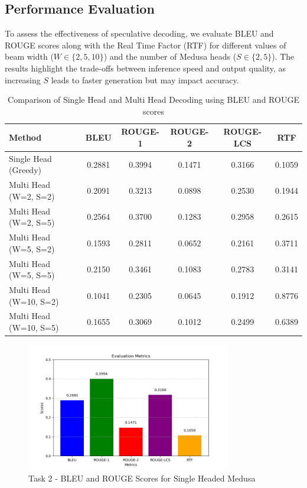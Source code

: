 \documentclass[12pt]{article}
\begin{document}
\subsection{Performance Evaluation}
To assess the effectiveness of speculative decoding, we evaluate BLEU and ROUGE scores along with the Real Time Factor (RTF) for different values of beam width ($W \in \{2, 5, 10\}$) and the number of Medusa heads ($S \in \{2, 5\}$). The results highlight the trade-offs between inference speed and output quality, as increasing $S$ leads to faster generation but may impact accuracy.

\begin{table}[htbp]
    \centering
    \begin{tabular}{|lccccc|}
        \hline
        \textbf{Method} & \textbf{BLEU} & \textbf{ROUGE-1} & \textbf{ROUGE-2} & \textbf{ROUGE-LCS} & \textbf{RTF} \\
        \hline
        Single Head (Greedy) & 0.2881 & 0.3994 & 0.1471 & 0.3166 & 0.1059 \\
        \hline
        Multi Head (W=2, S=2) & 0.2091 & 0.3213 & 0.0898 & 0.2530 & 0.1944 \\
        Multi Head (W=2, S=5) & 0.2564 & 0.3700 & 0.1283 & 0.2958 & 0.2615 \\
        Multi Head (W=5, S=2) & 0.1593 & 0.2811 & 0.0652 & 0.2161 & 0.3711 \\
        Multi Head (W=5, S=5) & 0.2150 & 0.3461 & 0.1083 & 0.2783 & 0.3141 \\
        Multi Head (W=10, S=2) & 0.1041 & 0.2305 & 0.0645 & 0.1912 & 0.8776 \\
        Multi Head (W=10, S=5) & 0.1655 & 0.3069 & 0.1012 & 0.2499 & 0.6389 \\
        \hline
    \end{tabular}
    \caption{Comparison of Single Head and Multi Head Decoding using BLEU and ROUGE scores}
    \label{tab:medusa_comparison}
\end{table}

\begin{figure}[htbp]
    \centering
    \includegraphics[width=0.8\textwidth]{task2_single.png}
    \caption{Task 2 - BLEU and ROUGE Scores for Single Headed Medusa}
    \label{fig:task2_single}
\end{figure}
\end{document}
